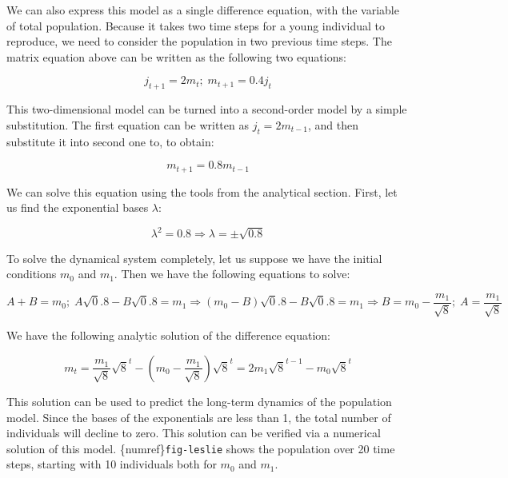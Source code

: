 \documentclass[
  letterpaper,
  DIV=11,
  numbers=noendperiod]{scrreprt}
\begin{document}
We can also express this model as a single difference equation, with the
variable of total population. Because it takes two time steps for a
young individual to reproduce, we need to consider the population in two
previous time steps. The matrix equation above can be written as the
following two equations:

\[
j_{t+1} = 2 m_t ; \; m_{t+1} = 0.4 j_t
\]

This two-dimensional model can be turned into a second-order model by a
simple substitution. The first equation can be written as
\(j_t = 2 m_{t-1}\), and then substitute it into second one to, to
obtain:

\[
m_{t+1} = 0.8m_{t-1}
\]

We can solve this equation using the tools from the analytical section.
First, let us find the exponential bases \(\lambda\):

\[
\lambda^2 = 0.8 \Rightarrow \lambda = \pm \sqrt{0.8}
\]

To solve the dynamical system completely, let us suppose we have the
initial conditions \(m_0\) and \(m_1\). Then we have the following
equations to solve:

\[
A + B = m_0; \; A\sqrt 0.8 - B \sqrt 0.8 = m_1\Rightarrow (m_0 - B) \sqrt 0.8 - B \sqrt 0.8 = m_1 \Rightarrow B =m_0 - \frac{m_1}{\sqrt 8}; \; A = \frac{m_1}{\sqrt 8}
\]

We have the following analytic solution of the difference equation:

\[
m_t = \frac{m_1}{\sqrt 8} \sqrt 8^t - \left(m_0 - \frac{m_1}{\sqrt 8} \right)  \sqrt 8^t = 2m_1 \sqrt 8^{t-1}  - m_0 \sqrt 8^{t}
\]

This solution can be used to predict the long-term dynamics of the
population model. Since the bases of the exponentials are less than 1,
the total number of individuals will decline to zero. This solution can
be verified via a numerical solution of this model.
\{numref\}\texttt{fig-leslie} shows the population over 20 time steps,
starting with 10 individuals both for \(m_0\) and \(m_1\).
\end{document}
